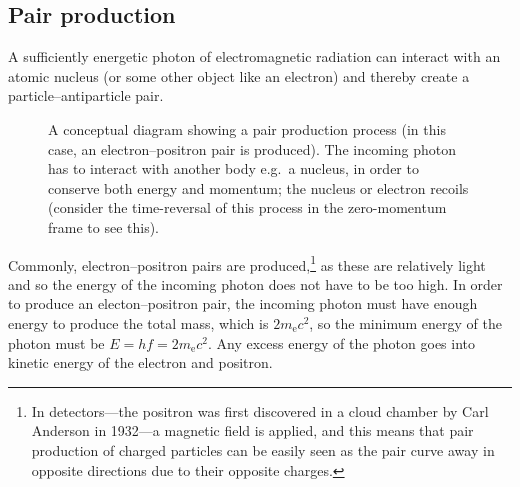 \subsection{Pair production}

A sufficiently energetic photon of electromagnetic radiation can interact with an atomic nucleus (or some other object like an electron) and thereby create a particle--antiparticle pair.

\begin{figure}
\caption{A conceptual diagram showing a pair production process (in this case, an electron--positron pair is produced).  The incoming photon has to interact with another body e.g.\ a nucleus, in order to conserve both energy and momentum; the nucleus or electron recoils (consider the time-reversal of this process in the zero-momentum frame to see this).}
\end{figure}

Commonly, electron--positron pairs are produced,\footnote{In detectors---the positron was first discovered in a cloud chamber by Carl Anderson in 1932---a magnetic field is applied, and this means that pair production of charged particles can be easily seen as the pair curve away in opposite directions due to their opposite charges.} as these are relatively light and so the energy of the incoming photon does not have to be too high.  In order to produce an electon--positron pair, the incoming photon must have enough energy to produce the total mass, which is $2m_{\mathrm{e}}c^{2}$, so the minimum energy of the photon must be $E=hf=2m_{\mathrm{e}}c^{2}$.  Any excess energy of the photon goes into kinetic energy of the electron and positron.
